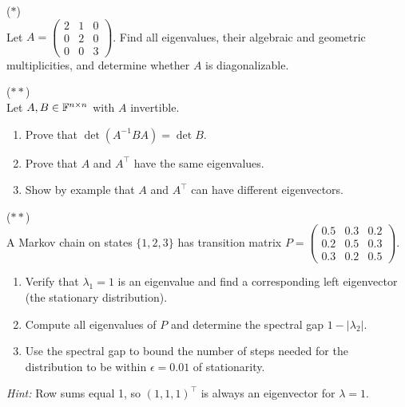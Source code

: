 \documentclass[11pt,a4paper]{article}
\begin{document}
\begin{exercise}
\label{exer:eigenvalue_analysis}
\textnormal{(\(*\))} \\
Let $A = \begin{pmatrix} 2 & 1 & 0 \\ 0 & 2 & 0 \\ 0 & 0 & 3 \end{pmatrix}$.
Find all eigenvalues, their algebraic and geometric multiplicities, and
determine whether $A$ is diagonalizable.
\end{exercise}

\begin{exercise}
\label{exer:det_identities}
\textnormal{(\(**\))} \\
Let $A, B \in \mathbb{F}^{n \times n}$ with $A$ invertible.
\begin{enumerate}[nosep,label=(\alph*)]
  \item Prove that $\det(A^{-1}BA) = \det B$.
  \item Prove that $A$ and $A^\top$ have the same eigenvalues.
  \item Show by example that $A$ and $A^\top$ can have different
        eigenvectors.
\end{enumerate}
\end{exercise}

\begin{exercise}
\label{exer:markov_spectral}
\textnormal{(\(**\))} \\
A Markov chain on states $\{1, 2, 3\}$ has transition matrix
$P = \begin{pmatrix} 0.5 & 0.3 & 0.2 \\ 0.2 & 0.5 & 0.3 \\
0.3 & 0.2 & 0.5 \end{pmatrix}$.
\begin{enumerate}[nosep,label=(\alph*)]
  \item Verify that $\lambda_1 = 1$ is an eigenvalue and find a
        corresponding left eigenvector (the stationary distribution).
  \item Compute all eigenvalues of $P$ and determine the spectral gap
        $1 - |\lambda_2|$.
  \item Use the spectral gap to bound the number of steps needed for the
        distribution to be within $\epsilon = 0.01$ of stationarity.
\end{enumerate}
\textit{Hint:} Row sums equal 1, so $(1,1,1)^\top$ is always an
eigenvector for $\lambda = 1$.
\end{exercise}
\end{document}
